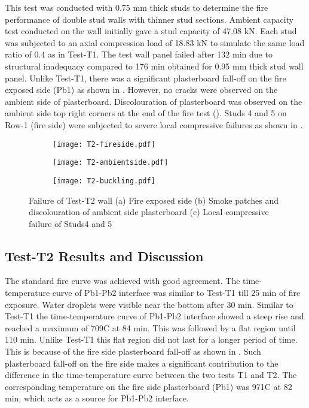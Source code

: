 This test was conducted with 0.75 mm thick studs to determine the fire performance of double stud walls with thinner stud sections. Ambient capacity test conducted on the wall initially gave a stud capacity of 47.08 kN. Each stud was subjected to an axial compression load of 18.83 kN to simulate the same load ratio of 0.4 as in Test-T1. The test wall panel failed after 132 min due to structural inadequacy compared to 176 min obtained for 0.95 mm thick stud wall panel. Unlike Test-T1, there was a significant plasterboard fall-off on the fire exposed side (Pb1) as shown in . However, no cracks were observed on the ambient side of plasterboard. Discolouration of plasterboard was observed on the ambient side top right corners at the end of the fire test (). Studs 4 and 5 on Row-1 (fire side) were subjected to severe local compressive failures as shown in .
\begin{figure}[!htbp]
	\centering
	\begin{subfigure}[b]{0.4\textwidth}
		\centering
		\texttt{[image: T2-fireside.pdf]}
		\caption{}
		\label{subfig:T2-fireside}
	\end{subfigure}
	\begin{subfigure}[b]{0.4\textwidth}
		\centering
		\texttt{[image: T2-ambientside.pdf]}
		\caption{}
		\label{subfig:T2-ambientside}
	\end{subfigure}
	\begin{subfigure}[b]{0.4\textwidth}
		\centering
		\texttt{[image: T2-buckling.pdf]}
		\caption{}
		\label{subfig:T2-buckling}
	\end{subfigure}
	   \caption{Failure of Test-T2 wall (a) Fire exposed side (b) Smoke patches and discolouration of ambient side plasterboard (c) Local compressive failure of Studs4 and 5}
	   \label{fig:T2-failure}
\end{figure}

\subsection{Test-T2 Results and Discussion}\label{sec:t2-results}

The standard fire curve was achieved with good agreement. The time-temperature curve of Pb1-Pb2 interface was similar to Test-T1 till 25 min of fire exposure. Water droplets were visible near the bottom after 30 min. Similar to Test-T1 the time-temperature curve of Pb1-Pb2 interface showed a steep rise and reached a maximum of 709\degree C at 84 min. This was followed by a flat region until 110 min. Unlike Test-T1 this flat region did not last for a longer period of time. This is because of the fire side plasterboard fall-off as shown in . Such plasterboard fall-off on the fire side makes a significant contribution to the difference in the time-temperature curve between the two tests T1 and T2. The corresponding temperature on the fire side plasterboard (Pb1) was 971\degree C at 82 min, which acts as a source for Pb1-Pb2 interface.

